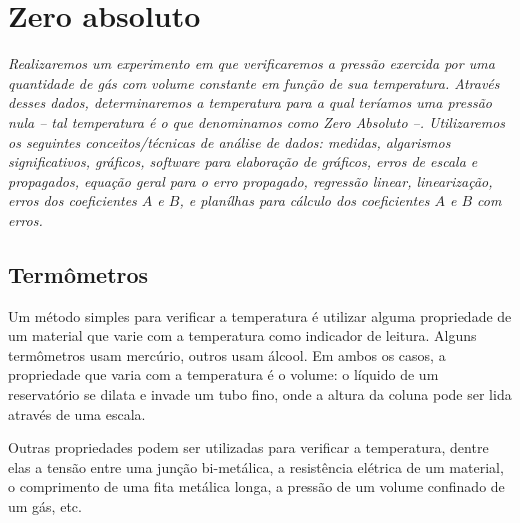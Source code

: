 \chapter{Zero absoluto}
\label{Chap:ExpZeroAbsoluto}

\begin{fullwidth}\it
	Realizaremos um experimento em que verificaremos a pressão exercida por uma quantidade de gás com volume constante em função de sua temperatura. Através desses dados, determinaremos a temperatura para a qual teríamos uma pressão nula -- tal temperatura é o que denominamos como Zero Absoluto --. Utilizaremos os seguintes conceitos/técnicas de análise de dados: medidas, algarismos significativos, gráficos, software para elaboração de gráficos, erros de escala e propagados, equação geral para o erro propagado, regressão linear, linearização, erros dos coeficientes $A$ e $B$, e planílhas para cálculo dos coeficientes $A$ e $B$ com erros.
\end{fullwidth}

\section{Termômetros}

Um método simples para verificar a temperatura é utilizar alguma propriedade de um material que varie com a temperatura como indicador de leitura. Alguns termômetros usam mercúrio, outros usam álcool. Em ambos os casos, a propriedade que varia com a temperatura é o volume: o líquido de um reservatório se dilata e invade um tubo fino, onde a altura da coluna pode ser lida através de uma escala.

Outras propriedades podem ser utilizadas para verificar a temperatura, dentre elas a tensão entre uma junção bi-metálica, a resistência elétrica de um material, o comprimento de uma fita metálica longa, a pressão de um volume confinado de um gás, etc. 

